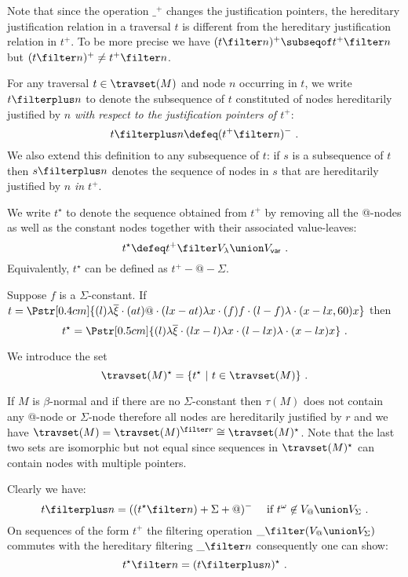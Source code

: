 Note that since the operation $\_^+$ changes the
justification pointers, the hereditary justification relation
in a traversal $t$ is different from the hereditary justification relation in $t^+$. To be more precise we have $(t\filter n)^+ \subseqof t^+ \filter n$ but $(t\filter n)^+ \neq t^+ \filter n$.


For any traversal $t\in \travset(M)$ and node $n$ occurring in $t$,
we write $t \filterplus n$ to denote the subsequence of $t$ constituted of nodes hereditarily justified by $n$
\emph{with respect to the justification pointers of $t^+$}:
$$t \filterplus n \defeq (t^+ \filter n)^- \ .$$
We also extend this definition to any subsequence of $t$: if $s$ is a
subsequence of $t$ then $s \filterplus n$ denotes the
sequence of nodes in $s$ that are hereditarily justified by $n$
\emph{in $t^+$}.
\bigskip

We write $t^\star$ to denote the sequence obtained from $t^+$ by
removing all the @-nodes as well as the constant nodes together with
their associated value-leaves:
$$ t^\star \defeq t^+ \filter V_\lambda \union V_{\sf var} \ .$$
Equivalently, $t^\star$ can be defined as $t^+ -@ - \Sigma$.
\begin{example} Suppose $f$ is a $\Sigma$-constant.
If $t = \Pstr[0.4cm]{ (l){\lambda \overline{\xi}} \cdot (at)@ \cdot (lx-at){\lambda x}\cdot (f)f \cdot (l-f){\lambda} \cdot (x-lx,60)x}$ then
$$t^\star = \Pstr[0.5cm]{ (l){\lambda \overline{\xi}}
 \cdot (lx-l){\lambda x}\cdot (l-lx){\lambda} \cdot (x-lx)x} \ .$$
\end{example}

 We introduce the set
$$\travset(M)^\star = \{ t^\star \ | \  t \in \travset(M) \} \ .$$

\begin{remark}
If $M$ is $\beta$-normal and if there are no $\Sigma$-constant then $\tau(M)$ does not contain any @-node
or $\Sigma$-node therefore all nodes are hereditarily justified by $r$ and we have
$\travset(M) = \travset(M)^{\filter r} \cong \travset(M)^\star$. Note that the last two sets are isomorphic but not equal since
sequences in $\travset(M)^\star$ can contain nodes with multiple pointers.
\end{remark}





\smallskip

Clearly we have:
\begin{equation}
t \filterplus n = ((t^\star\filter n) +\Sigma+@)^- \quad \mbox{ if } t^\omega \not\in V_@ \union V_\Sigma \ .
\end{equation}
On sequences of the form $t^+$ the filtering operation $\_ \filter (V_@\union V_\Sigma)$ commutes with the hereditary filtering $\_ \filter n$ consequently one can show:
\begin{equation}
t^\star \filter n = (t\filterplus n)^\star \label{eqn:starfilter_filterplusstar} \ .
\end{equation}



